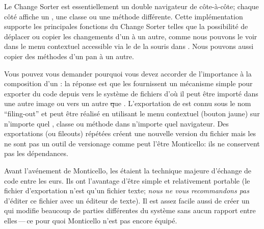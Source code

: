 \documentclass[a4paper,10pt,twoside]{book}
\begin{document}
Le Change Sorter est essentiellement un double navigateur de \changeset c\^ote-\`a-c\^ote;
chaque c\^ot\'e affiche un \changeset, une classe ou une m\'ethode diff\'erente.
Cette impl\'ementation supporte les principales fonctions du Change Sorter telles que
la possibilit\'e de d\'eplacer ou copier les changements d'un \changeset \`a un autre,
comme nous pouvons le voir dans le menu contextuel accessible via le 
de la souris dans .
Nous pouvons aussi copier des m\'ethodes d'un pan \`a un autre.

Vous pouvez vous demander pourquoi vous devez accorder de l'importance \`a la composition
d'un \changeset: la r\'eponse est que les \changesets fournissent un m\'ecanisme simple
pour exporter du code depuis \sq vers le syst\`eme de fichiers d'o\`u il peut
\^etre import\'e dans une autre image \sq ou vers un autre \st que \sq{}.
L'exportation de \changeset est connu sous le nom ``filing-out'' et peut \^etre r\'ealis\'e
en utilisant le menu contextuel (bouton jaune) sur n'importe quel \changeset, classe ou
m\'ethode dans n'importe quel navigateur.
Des exportations (ou fileouts) r\'ep\'et\'ees cr\'eent une nouvelle version du fichier
mais les \changesets ne sont pas un outil de versionage comme peut l'\^etre 
Monticello:
ils ne conservent pas les d\'ependances.

Avant l'av\'enement de Monticello, les \changesets \'etaient la technique majeure d'\'echange de code entre les \sq{}eurs.
Ils ont l'avantage d'\^etre simple et relativement portable (le fichier d'exportation n'est qu'un fichier texte; 
\emph{nous ne vous recommandons pas} d'\'editer ce fichier avec un \'editeur de texte).
Il est assez facile aussi de cr\'eer un \changeset qui modifie
beaucoup de parties diff\'erentes du syst\`eme sans aucun rapport entre elles\,---\,ce pour quoi Monticello n'est pas encore \'equip\'e.
\end{document}
